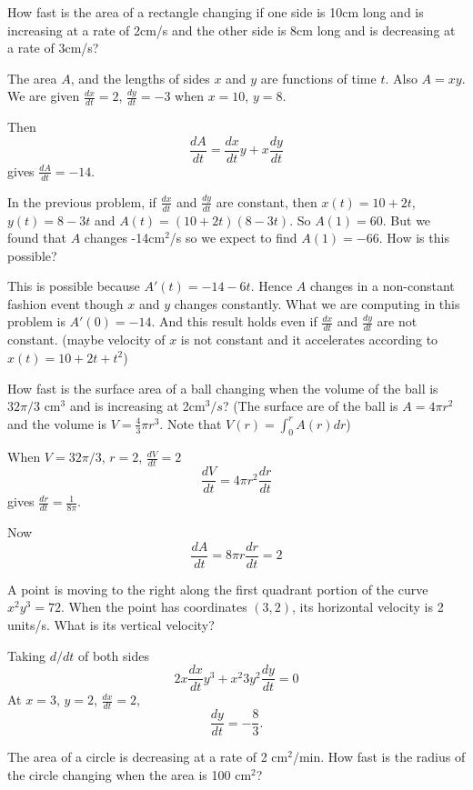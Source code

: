 \documentclass[../calc1-main.tex]{subfiles}
\begin{document}
\begin{example}
  How fast is the area of a rectangle changing if one side is 10cm long and is increasing at a rate of 2cm/s and the other side is 8cm long and is decreasing at a rate of 3cm/s?
\end{example}
\begin{solution}
  The area $A$, and the lengths of sides $x$ and $y$ are functions of time $t$. Also $A = x y$. We are given $\frac{dx}{dt} = 2$, $\frac{dy}{dt} = -3$ when $x=10$, $y=8$.

  Then
  \[
    \frac{dA}{dt} = \frac{dx}{dt} y + x \frac{dy}{dt}
  \]
  gives $\frac{dA}{dt} = -14$.
\end{solution}
In the previous problem, if $\frac{dx}{dt}$ and $\frac{dy}{dt}$ are constant, then $x(t) = 10 + 2t$, $y(t) = 8-3t$ and $A(t) = (10+2t)(8-3t)$. So $A(1) = 60$. But we found that $A$ changes -14cm$^2$/s so we expect to find $A(1)=-66$. How is this possible?

This is possible because $A'(t) = -14 - 6t$. Hence $A$ changes in a non-constant fashion event though $x$ and $y$ changes constantly. What we are computing in this problem is $A'(0) = - 14$. And this result holds even if $\frac{dx}{dt}$ and $\frac{dy}{dt}$ are not constant. (maybe velocity of $x$ is not constant and it accelerates according to $x(t) = 10 + 2t + t^2$)

\begin{example}
  How fast is the surface area of a ball changing when the volume of the ball is $32 \pi/3$ cm$^3$ and is increasing at 2cm$^3/s$? (The surface are of the ball is $A = 4\pi r^2$ and the volume is $V = \frac{4}{3} \pi r^3$. Note that $V(r) = \int_0^r A(r) dr$)
\end{example}
\begin{solution}
  When $V=32 \pi/3$, $r=2$, $\frac{dV}{dt} = 2$
  \[
    \frac{dV}{dt} = 4 \pi r^2 \frac{dr}{dt}
  \]
  gives $\frac{dr}{dt} = \frac{1}{8 \pi}$.

  Now
  \[
    \frac{dA}{dt} = 8 \pi r \frac{dr}{dt} = 2
  \]
\end{solution}

\begin{example}
  A point is moving to the right along the first quadrant portion of the curve $x^2 y^3 = 72$. When the point has coordinates $(3,2)$, its horizontal velocity is 2 units/s. What is its vertical velocity?
\end{example}
\begin{solution}
  Taking $d/dt$ of both sides
  \[
    2x \frac{dx}{dt} y^3 + x^2 3 y^2 \frac{dy}{dt} = 0
  \]
  At $x=3$, $y=2$, $\frac{dx}{dt} = 2$,
  \[
    \frac{dy}{dt} = - \frac{8}{3}.
  \]

\end{solution}

\begin{example}
  The area of a circle is decreasing at a rate of 2 cm$^2$/min. How fast is the radius of the circle changing when the area is 100 cm$^2$?
\end{example}
\end{document}
